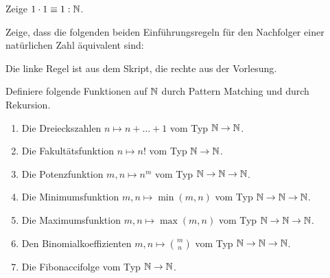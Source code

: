 \documentclass{uebung}
\begin{document}

\begin{exercise}
  Zeige $1\cdot 1\equiv 1:\mathbb{N}$.
\end{exercise}


\begin{exercise}
  Zeige, dass die folgenden beiden Einführungsregeln für den Nachfolger einer natürlichen Zahl äquivalent sind:
  {\tiny Die linke Regel ist aus dem Skript, die rechte aus der Vorlesung.}
\end{exercise}

\begin{exercise}
  Definiere folgende Funktionen auf $\mathbb{N}$ durch Pattern Matching und durch Rekursion.
  \begin{enumerate}
    \item Die Dreieckszahlen $n\mapsto n+\dots+1$ vom Typ $\mathbb{N}\to\mathbb{N}$.
    \item Die Fakultätsfunktion $n\mapsto n!$ vom Typ $\mathbb{N}\to\mathbb{N}$.
    \item Die Potenzfunktion $m,n\mapsto n^m$ vom Typ $\mathbb{N}\to\mathbb{N}\to\mathbb{N}$.
    \item Die Minimumsfunktion $m,n\mapsto\min(m,n)$ vom Typ $\mathbb{N}\to\mathbb{N}\to\mathbb{N}$.
    \item Die Maximumsfunktion $m,n\mapsto\max(m,n)$ vom Typ $\mathbb{N}\to\mathbb{N}\to\mathbb{N}$.
    \item Den Binomialkoeffizienten $m,n\mapsto\binom{m}{n}$ vom Typ $\mathbb{N}\to\mathbb{N}\to\mathbb{N}$.
    \item Die Fibonaccifolge vom Typ $\mathbb{N}\to\mathbb{N}$.
  \end{enumerate}
\end{exercise}
\end{document}

